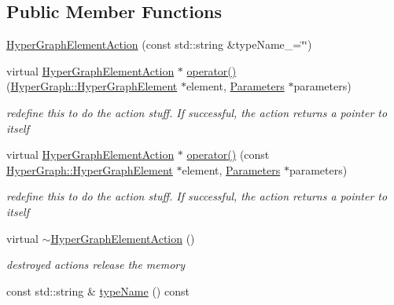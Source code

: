 \subsection*{Public Member Functions}
\begin{DoxyCompactItemize}
\item 
\mbox{\hyperlink{classg2o_1_1_hyper_graph_element_action_a1230bdd21f7c2b2c71e7206b59d81fd5}{Hyper\+Graph\+Element\+Action}} (const std\+::string \&type\+Name\+\_\+=\char`\"{}\char`\"{})
\item 
virtual \mbox{\hyperlink{classg2o_1_1_hyper_graph_element_action}{Hyper\+Graph\+Element\+Action}} $\ast$ \mbox{\hyperlink{classg2o_1_1_hyper_graph_element_action_a2faab4a1cdaf5fc010cb9c8627b7d361}{operator()}} (\mbox{\hyperlink{structg2o_1_1_hyper_graph_1_1_hyper_graph_element}{Hyper\+Graph\+::\+Hyper\+Graph\+Element}} $\ast$element, \mbox{\hyperlink{structg2o_1_1_hyper_graph_element_action_1_1_parameters}{Parameters}} $\ast$parameters)
\begin{DoxyCompactList}\small\item\em redefine this to do the action stuff. If successful, the action returns a pointer to itself \end{DoxyCompactList}\item 
virtual \mbox{\hyperlink{classg2o_1_1_hyper_graph_element_action}{Hyper\+Graph\+Element\+Action}} $\ast$ \mbox{\hyperlink{classg2o_1_1_hyper_graph_element_action_a0dc2ff77e22791e32810d2c43b7154ad}{operator()}} (const \mbox{\hyperlink{structg2o_1_1_hyper_graph_1_1_hyper_graph_element}{Hyper\+Graph\+::\+Hyper\+Graph\+Element}} $\ast$element, \mbox{\hyperlink{structg2o_1_1_hyper_graph_element_action_1_1_parameters}{Parameters}} $\ast$parameters)
\begin{DoxyCompactList}\small\item\em redefine this to do the action stuff. If successful, the action returns a pointer to itself \end{DoxyCompactList}\item 
virtual \mbox{\hyperlink{classg2o_1_1_hyper_graph_element_action_a01f7f7f2fb00018f2d0163a611f2f5da}{$\sim$\+Hyper\+Graph\+Element\+Action}} ()
\begin{DoxyCompactList}\small\item\em destroyed actions release the memory \end{DoxyCompactList}\item 
const std\+::string \& \mbox{\hyperlink{classg2o_1_1_hyper_graph_element_action_ae8c48d4b811320516bd5b0ef663190e3}{type\+Name}} () const

\end{DoxyCompactItemize}
